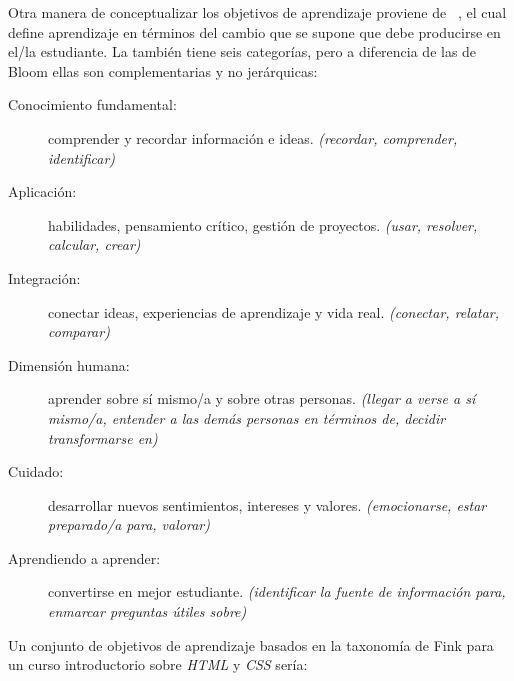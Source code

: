 Otra manera de conceptualizar los objetivos de aprendizaje proviene de ~\cite{Fink2013},
el cual define aprendizaje en términos del cambio que se supone que debe producirse en el/la estudiante.
La  también tiene seis categorías,
pero a diferencia de las de Bloom ellas son complementarias y no jerárquicas:
 
\begin{description}
 
\item[Conocimiento fundamental:]
  comprender y recordar información e ideas.
  \emph{(recordar, comprender, identificar)}
 
\item[Aplicación:]
  habilidades, pensamiento crítico, gestión de proyectos.
  \emph{(usar, resolver, calcular, crear)}
 
\item[Integración:]
  conectar ideas, experiencias de aprendizaje y vida real.
  \emph{(conectar, relatar, comparar)}
 
\item[Dimensión humana:]
  aprender sobre sí mismo/a y sobre otras personas.
  \emph{(llegar a verse a sí mismo/a, entender a las demás personas en términos de, decidir transformarse en)}
 
\item[Cuidado:]
  desarrollar nuevos sentimientos, intereses y valores.
  \emph{(emocionarse, estar preparado/a para, valorar)}
 
\item[Aprendiendo a aprender:]
  convertirse en mejor estudiante.
  \emph{(identificar la fuente de información para, enmarcar preguntas útiles sobre)}
 
\end{description}
 
Un conjunto de objetivos de aprendizaje basados en la taxonomía de Fink para un curso introductorio sobre \emph{HTML} y \emph{CSS} sería:
 

